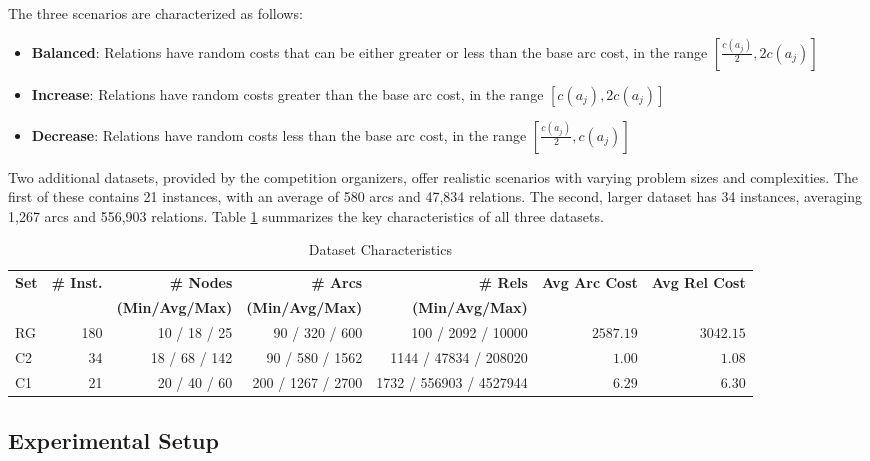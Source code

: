 \documentclass[twocolumn, switch]{article} %
\begin{document}
The three scenarios are characterized as follows:
\begin{itemize}
    \item \textbf{Balanced}: Relations have random costs that can be either greater or less than the base arc cost, in the range $[\frac{c(a_j)}{2}, 2c(a_j)]$
    \item \textbf{Increase}: Relations have random costs greater than the base arc cost, in the range $[c(a_j), 2c(a_j)]$
    \item \textbf{Decrease}: Relations have random costs less than the base arc cost, in the range $[\frac{c(a_j)}{2}, c(a_j)]$
\end{itemize}

Two additional datasets, provided by the competition organizers, offer realistic scenarios with varying problem sizes and complexities. The first of these contains 21 instances, with an average of 580 arcs and 47,834 relations. The second, larger dataset has 34 instances, averaging 1,267 arcs and 556,903 relations. Table \ref{tab:dataset_characteristics} summarizes the key characteristics of all three datasets.

\begin{table}[t]
    \setlength{\belowcaptionskip}{8pt}
    \caption{Dataset Characteristics}
    \label{tab:dataset_characteristics}
    \centering
    \begin{tabular}{lrrrrrr}
        \toprule
        \textbf{Set} & \textbf{\# Inst.} & \textbf{\# Nodes} & \textbf{\# Arcs} & \textbf{\# Rels} & \textbf{Avg Arc Cost} & \textbf{Avg Rel Cost} \\
        & & \textbf{(Min/Avg/Max)} & \textbf{(Min/Avg/Max)} & \textbf{(Min/Avg/Max)} & & \\
        \midrule
        RG & 180 & 10 / 18 / 25 & 90 / 320 / 600 & 100 / 2092 / 10000 & $2587.19$ & $3042.15$ \\
        C2 & 34 & 18 / 68 / 142 & 90 / 580 / 1562 & 1144 / 47834 / 208020 & $1.00$ & $1.08$ \\
        C1 & 21 & 20 / 40 / 60 & 200 / 1267 / 2700 & 1732 / 556903 / 4527944 & $6.29$ & $6.30$ \\
        \bottomrule
    \end{tabular}
\end{table}

\subsection{Experimental Setup}
\end{document}
